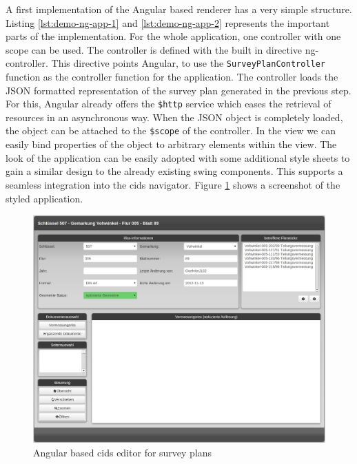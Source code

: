 A first implementation of the Angular based renderer has a very simple structure.
Listing \ref{lst:demo-ng-app-1} and \ref{lst:demo-ng-app-2} represents the important parts of the implementation.
For the whole application, one controller with one scope can be used.
The controller is defined with the built in directive ng-controller.
This directive points Angular, to use the \texttt{SurveyPlanController} function as the controller function for the application.
The controller loads the JSON formatted representation of the survey plan generated in the previous step.
For this, Angular already offers the \texttt{\$http} service which eases the retrieval of resources in an asynchronous way.
When the JSON object is completely loaded, the object can be attached to the \texttt{\$scope} of the controller.
In the view we can easily bind properties of the object to arbitrary elements within the view.
The look of the application can be easily adopted with some additional style sheets to gain a similar design to the already existing swing components. This supports a seamless integration into the cids navigator.
Figure \ref{fig:survey_plan_angular_editor} shows a screenshot of the styled application.

\begin{figure}
	\centering	\includegraphics[width=1.0\textwidth]{./img/impl/survey_plan_editor_new_alpha.png}
	\caption{Angular based cids editor for survey plans}
	\label{fig:survey_plan_angular_editor}
\end{figure}
 
